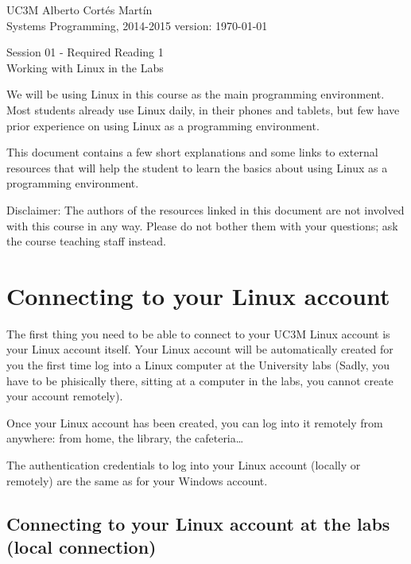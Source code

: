 \documentclass[a4paper, 12pt]{article}
\newcommand{\realtitle}{Session 01 - Required Reading 1}
\begin{document}
\makebox[\linewidth]{\rule{\textwidth}{0.4pt}}
UC3M \hfill Alberto Cortés Martín\\
Systems Programming, 2014-2015 \hfill version: \today\\
\makebox[\linewidth]{\rule{\textwidth}{0.4pt}}
\begin{center}
  \Large{\realtitle}\\Working with Linux in the Labs
\end{center}
\makebox[\linewidth]{\rule{\textwidth}{0.4pt}}
\vspace{0.5cm}

\tableofcontents
\vspace{1cm}

We will be using Linux in this course as the main programming environment.
Most students already use Linux daily, in their phones and tablets, but few
have prior experience on using Linux as a programming environment.

This document contains a few short explanations and some links to external
resources that will help the student to learn the basics about using Linux as a
programming environment.

Disclaimer: The authors of the resources linked in this document are not
involved with this course in any way. Please do not bother them with your
questions; ask the course teaching staff instead.

\section{Connecting to your Linux account}

The first thing you need to be able to connect to your UC3M Linux account is
your Linux account itself. Your Linux account will be automatically created for
you the first time log into a Linux computer at the University labs (Sadly, you
have to be phisically there, sitting at a computer in the labs, you cannot
create your account remotely).

Once your Linux account has been created, you can log into it remotely from
anywhere: from home, the library, the cafeteria\ldots

The authentication credentials to log into your Linux account (locally or
remotely) are the same as for your Windows account.

\subsection{Connecting to your Linux account at the labs (local connection)}
\end{document}
